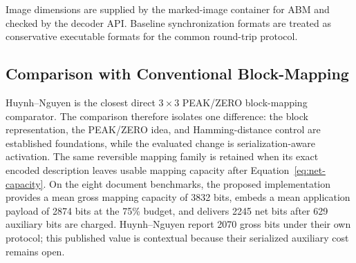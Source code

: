 \begin{table}[t]
\centering
\caption{Executable auxiliary-information model used for exact extraction and
restoration.}
\label{tab:wire-model}
\vspace{2pt}
{\footnotesize\RaggedRight Image dimensions are supplied by the marked-image container for ABM
and checked by the decoder API. Baseline synchronization formats are treated
as conservative executable formats for the common round-trip protocol.\par}
\end{table}

\subsection{Comparison with Conventional Block-Mapping}

\RevisionAddBegin
Huynh--Nguyen \cite{Huynh2025BlockMapping} is the closest direct
$3\times3$ PEAK/ZERO block-mapping comparator. The comparison therefore
isolates one difference: the block representation, the PEAK/ZERO idea, and
Hamming-distance control are established foundations, while the evaluated
change is serialization-aware activation. The same reversible mapping family is
retained when its exact encoded description leaves usable mapping capacity after
Equation~\ref{eq:net-capacity}. On the eight document benchmarks, the proposed
implementation provides a mean gross mapping capacity of 3832 bits, embeds a
mean application payload of 2874 bits at the 75\% budget, and delivers 2245
net bits after 629 auxiliary bits are charged. Huynh--Nguyen report 2070 gross
bits under their
own protocol; this published value is contextual because
their serialized auxiliary cost remains open.
\RevisionAddEnd

